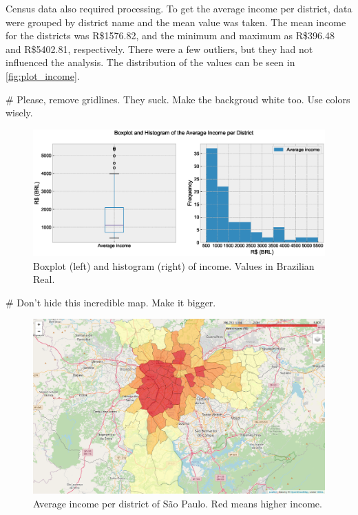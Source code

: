 \documentclass[12pt]{article}
\begin{document}
Census data also required processing. To get the average income per district, data were grouped by district name and the mean value was taken.
The mean income for the districts was R\$1576.82, and the minimum and maximum
as R\$396.48 and R\$5402.81, respectively. There were a few outliers, but they had not influenced the analysis. The distribution of the
values can be seen in \autoref{fig:plot_income}.

# Please, remove gridlines. They suck. Make the backgroud white too. Use colors wisely.


\begin{figure}[htb]
        \centering
        \includegraphics[width=\linewidth]{plot_income.eps}
        \caption{Boxplot (left) and histogram (right) of income. Values in
        Brazilian Real.\label{fig:plot_income}}
\end{figure}

# Don't hide this incredible map. Make it bigger.

\begin{figure}
        \centering
        \includegraphics[width=\linewidth]{map_income.png}
        \caption{Average income per district of São Paulo. Red means higher
        income.\label{fig:map_income}}
\end{figure}
\end{document}
